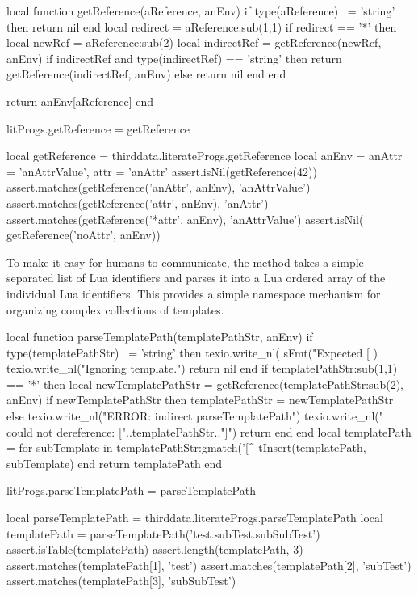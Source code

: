 {{\startLuaCode
local function getReference(aReference, anEnv)
  if type(aReference) ~= 'string' then return nil end
  local redirect = aReference:sub(1,1)
  if redirect == '*' then
    local newRef = aReference:sub(2)
    local indirectRef = getReference(newRef, anEnv)
    if indirectRef and type(indirectRef) == 'string' then
      return getReference(indirectRef, anEnv)
    else
      return nil
    end
  end

  return anEnv[aReference]
end

litProgs.getReference = getReference
\stopLuaCode

\startLuaTest
local getReference = thirddata.literateProgs.getReference
local anEnv = { 
  anAttr = 'anAttrValue',
  attr   = 'anAttr'
}
assert.isNil(getReference(42))
assert.matches(getReference('anAttr', anEnv), 'anAttrValue')
assert.matches(getReference('attr',   anEnv), 'anAttr')
assert.matches(getReference('*attr',  anEnv), 'anAttrValue')
assert.isNil(  getReference('noAttr', anEnv))
\stopLuaTest
\stopTestCase
\stopTestSuite

\startTestSuite[parseTemplatePath]

To make it easy for humans to communicate, the  
method takes a simple  separated list of Lua identifiers and 
parses it into a Lua ordered array of the individual Lua identifiers. This 
provides a simple namespace mechanism for organizing complex collections 
of templates. 

\startLuaCode
local function parseTemplatePath(templatePathStr, anEnv)
  if type(templatePathStr) ~= 'string' then
    texio.write_nl(
      sFmt("Expected [%
    )
    texio.write_nl("Ignoring template.")
    return nil
  end
  if templatePathStr:sub(1,1) == '*' then
    local newTemplatePathStr = getReference(templatePathStr:sub(2), anEnv)
    if newTemplatePathStr then
      templatePathStr = newTemplatePathStr
    else
      texio.write_nl("ERROR: indirect parseTemplatePath")
      texio.write_nl("  could not dereference: ["..templatePathStr.."]")
      return { }
    end
  end
  local templatePath = { }
  for subTemplate in templatePathStr:gmatch('[^%
    tInsert(templatePath, subTemplate)
  end
  return templatePath
end

litProgs.parseTemplatePath = parseTemplatePath
\stopLuaCode

\startLuaTest
local parseTemplatePath = thirddata.literateProgs.parseTemplatePath
local templatePath = parseTemplatePath('test.subTest.subSubTest')
assert.isTable(templatePath)
assert.length(templatePath, 3)
assert.matches(templatePath[1], 'test')
assert.matches(templatePath[2], 'subTest')
assert.matches(templatePath[3], 'subSubTest')
\stopLuaTest
\stopTestCase

}}
